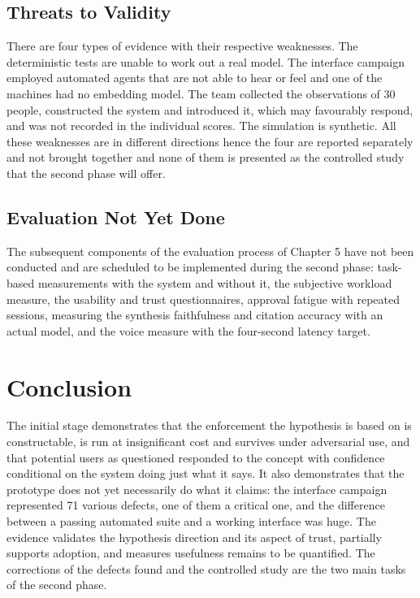 \documentclass{FastFyp}
\begin{document}
\subsection{Threats to Validity}
There are four types of evidence with their respective weaknesses. The deterministic tests are unable to work out a real model. The interface campaign employed automated agents that are not able to hear or feel and one of the machines had no embedding model. The team collected the observations of 30 people, constructed the system and introduced it, which may favourably respond, and was not recorded in the individual scores. The simulation is synthetic. All these weaknesses are in different directions hence the four are reported separately and not brought together and none of them is presented as the controlled study that the second phase will offer.

\subsection{Evaluation Not Yet Done}
The subsequent components of the evaluation process of Chapter 5 have not been conducted and are scheduled to be implemented during the second phase: task-based measurements with the system and without it, the subjective workload measure, the usability and trust questionnaires, approval fatigue with repeated sessions, measuring the synthesis faithfulness and citation accuracy with an actual model, and the voice measure with the four-second latency target.

\section{Conclusion}
The initial stage demonstrates that the enforcement the hypothesis is based on is constructable, is run at insignificant cost and survives under adversarial use, and that potential users as questioned responded to the concept with confidence conditional on the system doing just what it says. It also demonstrates that the prototype does not yet necessarily do what it claims: the interface campaign represented 71 various defects, one of them a critical one, and the difference between a passing automated suite and a working interface was huge. The evidence validates the hypothesis direction and its aspect of trust, partially supports adoption, and measures usefulness remains to be quantified. The corrections of the defects found and the controlled study are the two main tasks of the second phase.
\end{document}
